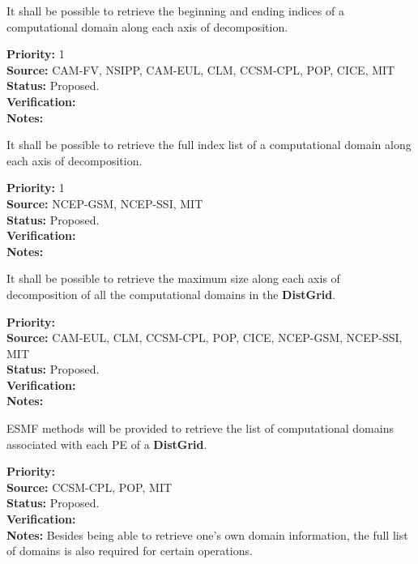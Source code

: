 
It shall be possible to retrieve the beginning and ending indices of a
computational domain along each axis of decomposition.

\begin{reqlist}
{\bf Priority:} 1 \\ 
{\bf Source:} CAM-FV, NSIPP, CAM-EUL, CLM, CCSM-CPL, POP, CICE, MIT
{\bf Status:} Proposed. \\
{\bf Verification:} \\
{\bf Notes:}
\end{reqlist}


It shall be possible to retrieve the full index list of a
computational domain along each axis of decomposition.

\begin{reqlist}
{\bf Priority:} 1 \\ 
{\bf Source:} NCEP-GSM, NCEP-SSI, MIT \\
{\bf Status:} Proposed. \\
{\bf Verification:} \\
{\bf Notes:}
\end{reqlist}


It shall be possible to retrieve the maximum size along each axis of
decomposition of all the computational domains in the \textbf{DistGrid}. 

\begin{reqlist}
{\bf Priority:} \\ 
{\bf Source:} CAM-EUL, CLM, CCSM-CPL, POP, CICE, NCEP-GSM, NCEP-SSI, MIT \\
{\bf Status:} Proposed. \\
{\bf Verification:} \\
{\bf Notes:}
\end{reqlist}


ESMF methods will be provided to retrieve the list of computational
domains associated with each PE of a  \textbf{DistGrid}.

\begin{reqlist}
{\bf Priority:} \\ 
{\bf Source:} CCSM-CPL, POP, MIT \\
{\bf Status:} Proposed. \\
{\bf Verification:} \\
{\bf Notes:} Besides being able to retrieve one's own domain
  information, the full list of domains is also required for certain
  operations.
\end{reqlist}

